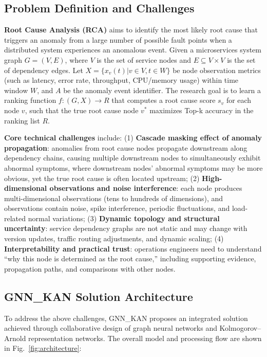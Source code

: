 \documentclass[conference]{IEEEtran}
\begin{document}
\subsection{Problem Definition and Challenges}

\textbf{Root Cause Analysis (RCA)} aims to identify the most likely root cause that triggers an anomaly from a large number of possible fault points when a distributed system experiences an anomalous event. Given a microservices system graph $G=(V, E)$, where $V$ is the set of service nodes and $E \subseteq V \times V$ is the set of dependency edges. Let $X = \{x_v(t) | v \in V, t \in W\}$ be node observation metrics (such as latency, error rate, throughput, CPU/memory usage) within time window $W$, and $A$ be the anomaly event identifier. The research goal is to learn a ranking function $f: (G, X) \to R$ that computes a root cause score $s_v$ for each node $v$, such that the true root cause node $v^*$ maximizes Top-k accuracy in the ranking list $R$.

\textbf{Core technical challenges} include: (1) \textbf{Cascade masking effect of anomaly propagation}: anomalies from root cause nodes propagate downstream along dependency chains, causing multiple downstream nodes to simultaneously exhibit abnormal symptoms, where downstream nodes' abnormal symptoms may be more obvious, yet the true root cause is often located upstream; (2) \textbf{High-dimensional observations and noise interference}: each node produces multi-dimensional observations (tens to hundreds of dimensions), and observations contain noise, spike interference, periodic fluctuations, and load-related normal variations; (3) \textbf{Dynamic topology and structural uncertainty}: service dependency graphs are not static and may change with version updates, traffic routing adjustments, and dynamic scaling; (4) \textbf{Interpretability and practical trust}: operations engineers need to understand ``why this node is determined as the root cause,'' including supporting evidence, propagation paths, and comparisons with other nodes.

\subsection{GNN\_KAN Solution Architecture}

To address the above challenges, GNN\_KAN proposes an integrated solution achieved through collaborative design of graph neural networks and Kolmogorov--Arnold representation networks. The overall model and processing flow are shown in Fig.~\ref{fig:architecture}:
\end{document}
